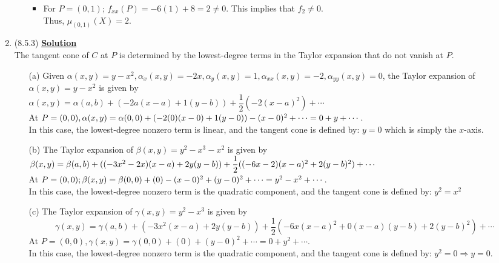 \documentclass[11pt]{article}
\begin{document}
\begin{enumerate}
\begin{itemize}
\begin{itemize}
				\item For $P = (0,1)$;
				$
				f_{xx}(P) = -6(1) +8 = 2 \neq 0.
				$ This implies that $f_2 \neq  0$.\\
				Thus, $\mu _{(0,1)}(X)=2$.
				
			\end{itemize}
		\end{itemize}
		
		\item (8.5.3) 
		\textbf{\underline{Solution}}\\
		The tangent cone of $C$ at $P$ is determined by the lowest-degree terms in the Taylor expansion that do not vanish at $P$.
		\begin{itemize}
			\item [(a)] Given $\alpha(x,y) = y -x^2, \alpha_x(x,y) = -2x,\alpha_y(x,y) = 1, \alpha_{xx}(x,y) =-2, \alpha_{yy}(x,y) =0$,  the Taylor expansion of $\alpha(x,y) = y -x^2$ is given by \\ $\alpha(x,y) =\alpha(a,b) + (-2a(x-a) + 1(y-b)) + \dfrac{1}{2}(-2(x-a)^2 ) + \cdots$\\
			At $P = (0,0),\\ \alpha(x,y) = \alpha(0,0) + (-2(0)(x-0) + 1(y-0)) -(x-0)^2 + \cdots= 0 + y + \cdots$.\\
			In this case, the lowest-degree nonzero term is linear, and the tangent cone is defined by: $y = 0$ which is simply the $x$-axis.
			\item [(b)] The Taylor expansion of $\beta(x,y) = y^2 - x^3- x^2$ is given by \\$\beta(x,y) =\beta(a,b) + ((-3x^2-2x)(x-a) + 2y(y-b)) +\dfrac{1}{2}((-6x-2)(x-a)^2  +\\  2(y-b)^2) + \cdots$\\
			At $P = (0,0);\\ \beta(x,y) = \beta(0,0) +  (0) -(x-0)^2 +(y-0)^2+ \cdots=y^2 -x^2 + \cdots$.\\
			In this case, the lowest-degree nonzero term is the quadratic component, and the tangent cone is defined by: $y^2 = x^2$ 
			\item [(c)]The Taylor expansion of $\gamma (x,y) = y^2 - x^3$ is given by \[\gamma(x,y) =\gamma(a,b) + (-3x^2(x-a) + 2y(y-b)) + \dfrac{1}{2}(-6x(x-a)^2 + 0(x-a)(y-b) + 2(y-b)^2) + \cdots\]
			At $P = (0,0), \gamma(x,y) = \gamma(0,0) + (0) +(y-0)^2 + \cdots= 0 + y^2 + \cdots$.\\
			In this case, the lowest-degree nonzero term is the quadratic component, and the tangent cone is defined by: $y^2 = 0 \Longrightarrow y = 0.$

\end{itemize}
\end{enumerate}
\end{document}

